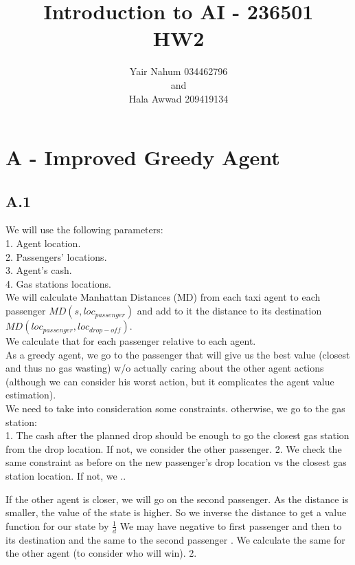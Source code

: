 \documentclass[12pt]{article}
\title{Introduction to AI - 236501\\HW2}
\author{Yair Nahum 034462796\\and\\Hala Awwad 209419134 }
\begin{document}
\maketitle


\section*{A - Improved Greedy Agent}

\subsection*{A.1}

We will use the following parameters:\\
1. Agent location.\\
2. Passengers' locations.\\
3. Agent's cash.\\
4. Gas stations locations.\\

We will calculate Manhattan Distances (MD) from each taxi agent to each passenger $MD(s,loc_{passenger})$ and add to it the distance to its destination $MD(loc_{passenger},loc_{drop-off})$.\\
We calculate that for each passenger relative to each agent.\\
As a greedy agent, we go to the passenger that will give us the best value (closest and thus no gas wasting) w/o actually caring about the other agent actions (although we can consider his worst action, but it complicates the agent value estimation).\\
We need to take into consideration some constraints. otherwise, we go to the gas station:\\
1. The cash after the planned drop should be enough to go the closest gas station from the drop location. If not, we consider the other passenger.
2. We check the same constraint as before on the new passenger's drop location vs the closest gas station location. If not, we ..

If the other agent is closer, we will go on the second passenger.
As the distance is smaller, the value of the state is higher. So we inverse the distance to get a value function for our state by $\frac{1}{d}$
We may have negative 
 to first passenger and then to its destination and the same to the second passenger . We calculate the same for the other agent (to consider who will win).
2. 
\end{document}
